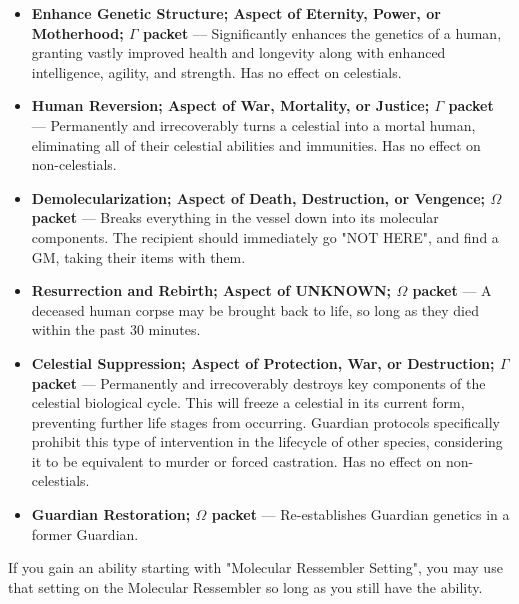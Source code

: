 \documentclass[green]{guardians}
\begin{document}
\begin{itemize}

\item \textbf{Enhance Genetic Structure; Aspect of Eternity, Power, or Motherhood; $\Gamma$ packet} --- Significantly enhances the genetics of a human, granting vastly improved health and longevity along with enhanced intelligence, agility, and strength. Has no effect on celestials.

\item \textbf{Human Reversion; Aspect of War, Mortality, or Justice; $\Gamma$ packet} --- Permanently and irrecoverably turns a celestial into a mortal human, eliminating all of their celestial abilities and immunities. Has no effect on non-celestials.

\item \textbf{Demolecularization; Aspect of Death, Destruction, or Vengence; $\Omega$ packet} --- Breaks everything in the vessel down into its molecular components. The recipient should immediately go "NOT HERE", and find a GM, taking their items with them.

\item \textbf{Resurrection and Rebirth; Aspect of UNKNOWN; $\Omega$ packet} --- A deceased human corpse may be brought back to life, so long as they died within the past 30 minutes.

\item \textbf{Celestial Suppression; Aspect of Protection, War, or Destruction; $\Gamma$ packet} --- Permanently and irrecoverably destroys key components of the celestial biological cycle. This will freeze a celestial in its current form, preventing further life stages from occurring. Guardian protocols specifically prohibit this type of intervention in the lifecycle of other species, considering it to be equivalent to murder or forced castration. Has no effect on non-celestials.

\item \textbf{Guardian Restoration; $\Omega$ packet} --- Re-establishes Guardian genetics in a former Guardian.
	
\end{itemize}

If you gain an ability starting with "Molecular Ressembler Setting", you may use that setting on the Molecular Ressembler so long as you still have the \aGuardianTech{} ability.
\end{document}
